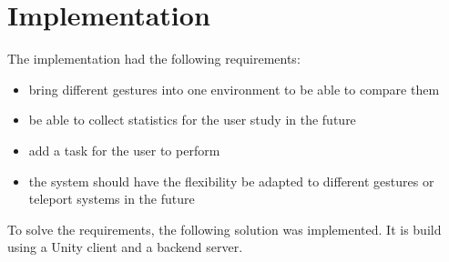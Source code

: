 \chapter{Implementation}
The implementation had the following requirements: 

\begin{itemize}
    \item bring different gestures into one environment to be able to compare them
    \item be able to collect statistics for the user study in the future
    \item add a task for the user to perform
    \item the system should have the flexibility be adapted to different gestures or teleport systems in the future
\end{itemize}

To solve the requirements, the following solution was implemented. It is build using a Unity client and a backend server.